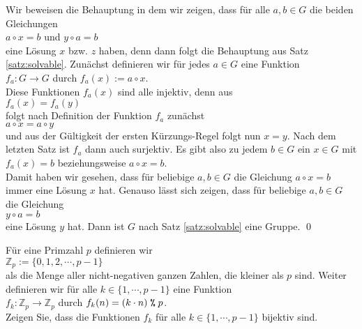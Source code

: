 \proof Wir beweisen die Behauptung in dem wir zeigen, dass f\"{u}r alle $a,b \in G$ die beiden Gleichungen
\\[0.2cm]
\hspace*{1.3cm} $a \circ x = b$ \quad und \quad $y \circ a = b$
\\[0.2cm]
eine L\"{o}sung $x$ bzw. $z$ haben, denn dann folgt die Behauptung aus Satz \ref{satz:solvable}.  Zun\"{a}chst definieren wir f\"{u}r
jedes $a \in G$ eine Funktion
\\[0.2cm]
\hspace*{1.3cm} $f_a: G \rightarrow G$ \quad durch \quad $f_a(x) := a \circ x$.
\\[0.2cm]
Diese Funktionen $f_a(x)$ sind alle injektiv, denn aus
\\[0.2cm]
\hspace*{1.3cm} $f_a(x) = f_a(y)$
\\[0.2cm]
folgt nach Definition der Funktion $f_a$ zun\"{a}chst
\\[0.2cm]
\hspace*{1.3cm} $a \circ x = a \circ y$
\\[0.2cm]
und aus der G\"{u}ltigkeit der ersten K\"{u}rzungs-Regel folgt nun $x = y$.  Nach dem letzten Satz ist $f_a$ dann
auch surjektiv.  Es gibt also zu jedem $b \in G$ ein $x \in G$ mit
\\[0.2cm]
\hspace*{1.3cm} $f_a(x) = b$ \quad beziehungsweise \quad $a \circ x = b$.
\\[0.2cm]
Damit haben wir gesehen, dass f\"{u}r beliebige $a,b \in G$ die Gleichung $a \circ x = b$ immer eine L\"{o}sung
$x$ hat.  Genauso l\"{a}sst sich  zeigen, dass f\"{u}r beliebige $a,b \in G$ die Gleichung
\\[0.2cm]
\hspace*{1.3cm}
$y \circ a = b$
\\[0.2cm]
eine L\"{o}sung $y$ hat.  Dann ist $G$ nach Satz \ref{satz:solvable} eine Gruppe. \qed

\exercise
F\"{u}r eine Primzahl $p$ definieren wir
\\[0.2cm]
\hspace*{1.3cm}
$\mathbb{Z}_p := \{ 0, 1, 2, \cdots, p - 1 \}$
\\[0.2cm]
als die Menge aller nicht-negativen ganzen Zahlen, die kleiner als $p$ sind.  Weiter
definieren wir f\"{u}r alle $k \in \{1,\cdots,p-1\}$ eine Funktion
\\[0.2cm]
\hspace*{1.3cm}
$f_k: \mathbb{Z}_p \rightarrow \mathbb{Z}_p$ \quad durch \quad $f_k(n) = (k \cdot n) \;\texttt{\symbol{37}}\;p$.
\\[0.2cm]
Zeigen Sie, dass die Funktionen $f_k$ f\"{u}r alle $k \in \{1, \cdots, p-1\}$ bijektiv sind.

